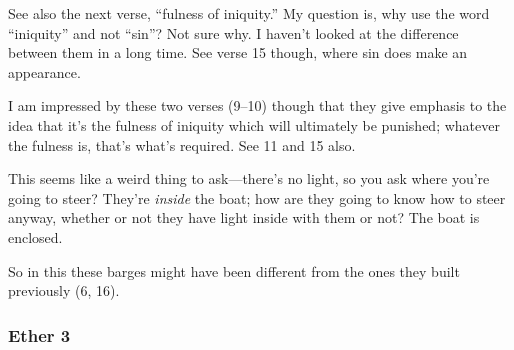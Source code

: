 		\begin{compactdesc}
		
		\item[9$\vert$]
		\begin{compactdesc}
		\item[ripened in iniquity] See also the next verse, ``fulness of iniquity.'' My question is, why use the word ``iniquity'' and not ``sin''? Not sure why. I haven't looked at the difference between them in a long time. See verse 15 though, where sin does make an appearance.
		
		I am impressed by these two verses (9--10) though that they give emphasis to the idea that it's the fulness of iniquity which will ultimately be punished; whatever the fulness is, that's what's required. See 11 and 15 also.
		\end{compactdesc}
		
		\item[19$\vert$]
		\begin{compactdesc}
		\item[no light; whither shall we steer?] This seems like a weird thing to ask---there's no light, so you ask where you're going to steer? They're \textit{inside} the boat; how are they going to know how to steer anyway, whether or not they have light inside with them or not? The boat is enclosed.
		
		So in this these barges might have been different from the ones they built previously (6, 16).
		\end{compactdesc}
		
		\end{compactdesc}
		
	\subsubsection{Ether 3} %
	
